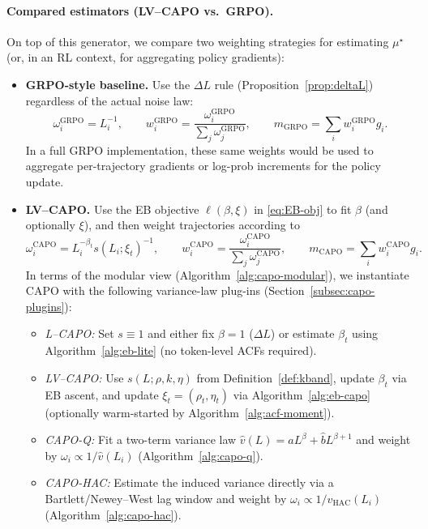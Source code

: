 \paragraph{Compared estimators (LV--CAPO vs.\ GRPO).}
On top of this generator, we compare two weighting strategies for estimating \(\mu^\star\) (or, in an RL context, for aggregating policy gradients):

\begin{itemize}
  \item \textbf{GRPO-style baseline.}
  Use the \(\Delta L\) rule (Proposition~\ref{prop:deltaL}) regardless of the actual noise law:
  \[
  \omega_i^{\mathrm{GRPO}} = L_i^{-1},\qquad
  w_i^{\mathrm{GRPO}} = \frac{\omega_i^{\mathrm{GRPO}}}{\sum_j \omega_j^{\mathrm{GRPO}}},\qquad
  m_{\mathrm{GRPO}} = \sum_i w_i^{\mathrm{GRPO}} g_i.
  \]
  In a full GRPO implementation, these same weights would be used to aggregate per-trajectory gradients or log-prob increments for the policy update.

  \item \textbf{LV--CAPO.}
  Use the EB objective \(\ell(\beta,\xi)\) in \eqref{eq:EB-obj} to fit \(\beta\) (and optionally \(\xi\)), and then weight trajectories according to
  \[
  \omega_i^{\mathrm{CAPO}} = L_i^{-\beta_t} s(L_i;\xi_t)^{-1},
  \qquad
  w_i^{\mathrm{CAPO}} = \frac{\omega_i^{\mathrm{CAPO}}}{\sum_j \omega_j^{\mathrm{CAPO}}},
  \qquad
  m_{\mathrm{CAPO}} = \sum_i w_i^{\mathrm{CAPO}} g_i.
  \]
  In terms of the modular view (Algorithm~\ref{alg:capo-modular}), we instantiate CAPO with the following variance-law plug-ins (Section~\ref{subsec:capo-plugins}):
  \begin{itemize}
    \item \emph{L--CAPO:} Set \(s\equiv 1\) and either fix \(\beta=1\) (\(\Delta L\)) or estimate \(\beta_t\) using Algorithm~\ref{alg:eb-lite} (no token-level ACFs required).
    \item \emph{LV--CAPO:} Use \(s(L;\rho,k,\eta)\) from Definition~\ref{def:kband}, update \(\beta_t\) via EB ascent, and update \(\xi_t=(\rho_t,\eta_t)\) via Algorithm~\ref{alg:eb-capo} (optionally warm-started by Algorithm~\ref{alg:acf-moment}).
    \item \emph{CAPO-Q:} Fit a two-term variance law \(\widehat v(L)=\widehat a L^{\beta}+\widehat b L^{\beta+1}\) and weight by \(\omega_i\propto 1/\widehat v(L_i)\) (Algorithm~\ref{alg:capo-q}).
    \item \emph{CAPO-HAC:} Estimate the induced variance directly via a Bartlett/Newey--West lag window and weight by \(\omega_i\propto 1/\widehat v_{\mathrm{HAC}}(L_i)\) (Algorithm~\ref{alg:capo-hac}).
  \end{itemize}
\end{itemize}

